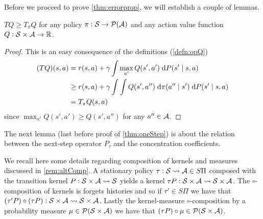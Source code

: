 
Before we proceed to prove \cref{thm:errorprop},
we will establish a couple of lemmas.

\begin{lem}\label{lem:tlemma}
  $T Q \geq T_\pi Q$ for any policy $\pi : \mathcal{S} \to \mathcal{P}(\mathcal{A})$
  and any action value function $Q: \mathcal{S} \times \mathcal{A} \to \mathbb{R}$.
\end{lem}
\begin{proof}
  This is an easy consequence of the definitions (\cref{defn:opQ})
  \begin{align*}
    (TQ)(s, a) &= r(s, a) + \gamma \int \max_{a'} Q(s', a')
    \; \mathrm{d} P(s' \mid s, a)
    \\ &\geq r(s, a) + \gamma \int \int Q(s', a'')
    \; \mathrm{d} \pi(a'' \mid s') \; \mathrm{d} P(s' \mid s, a)
    \\ &= T_\pi Q(s,a)
  \end{align*}
  since $\max_{a'} Q(s', a') \geq Q(s', a'')$ for any $a'' \in \mathcal{A}$.
\end{proof}

The next lemma (last before proof of \ref{thm:oneStep}) is about the
relation between the next-step operator $P_\tau$ and the
concentration coefficients.

We recall here some details regarding composition of kernels and measures
discussed in \cref{rem:altComp}.
A stationary policy $\tau : \mathcal{S} \leadsto \mathcal{A} \in S\Pi$ composed
with the transition kernel $P : \mathcal{S} \times \mathcal{A} \leadsto \mathcal{S}$
yields a kernel $\tau P : \mathcal{S} \times \mathcal{A} \leadsto \mathcal{S} \times \mathcal{A}$.
The $\circ$-composition of kernels is forgets histories and so if
$\tau' \in S\Pi$ we have that 
$(\tau' P) \circ (\tau P) : \mathcal{S} \times \mathcal{A} \leadsto \mathcal{S} \times \mathcal{A}$.
Lastly the kernel-measure $\circ$-composition by a probability measure
$\mu \in \mathcal{P}(\mathcal{S} \times \mathcal{A})$ we have that
$(\tau P) \circ \mu \in \mathcal{P}(\mathcal{S} \times \mathcal{A})$.


